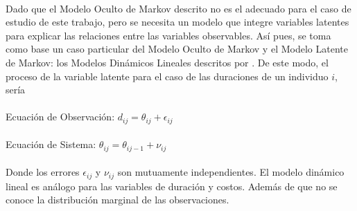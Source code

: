 \\
Dado que el Modelo Oculto de Markov descrito no es el adecuado para el caso de estudio de este trabajo, pero se necesita un modelo que integre variables latentes para explicar las relaciones entre las variables observables. As\'i pues, se toma como base un caso particular del Modelo Oculto de Markov y el Modelo Latente de Markov: los Modelos Din\'amicos Lineales descritos por \cite{harrison1999bayesian}. De este modo, el proceso de la variable latente para el caso de las duraciones de un individuo $i$, ser\'ia\\
\\
Ecuaci\'on de Observaci\'on: $d_{ij}=\theta_{ij} + \epsilon_{ij}$\\
\\
Ecuaci\'on de Sistema: $\theta_{ij}=\theta_{ij-1}+ \nu_{ij}$\\
\\
Donde los errores $\epsilon_{ij}$ y $\nu_{ij}$ son mutuamente independientes. El modelo din\'amico lineal es an\'alogo para las variables de duraci\'on y costos. Adem\'as de que no se conoce la distribuci\'on marginal de las observaciones.\\
